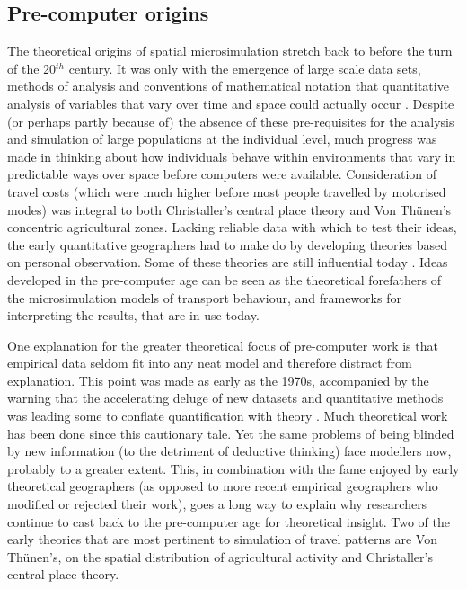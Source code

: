 \subsection{Pre-computer origins}
The theoretical origins of spatial microsimulation stretch back to before the
turn of the 20$^{th}$ century. It was only with the emergence of large scale
data sets, methods of analysis and conventions of mathematical notation that
quantitative analysis of variables that vary over time and space could actually
occur \citep{Ballas2009-sage}.
Despite (or perhaps partly because of) the absence of these pre-requisites for
the analysis and simulation of large populations at the individual level, much
progress was made in thinking about how individuals behave within environments
that vary in predictable ways over space before computers were available.
Consideration of travel costs (which were much higher before most
people travelled by motorised modes) was integral to both Christaller's
central place theory and Von Th\"{u}nen's concentric agricultural zones.
Lacking reliable data with which to test their ideas, the
early quantitative geographers had to make do by
developing theories based on personal observation.
Some of these theories are still influential today \citep{Clarke1985}.
Ideas developed in the pre-computer age can be seen as the theoretical
forefathers of the microsimulation models of transport behaviour, and frameworks
for interpreting the results, that are in use today.

One explanation for the greater theoretical focus of pre-computer work
is that empirical data seldom fit into any neat model and therefore
distract from explanation.
This point was made as early as the 1970s, accompanied by the
warning that the
accelerating deluge of new datasets and quantitative methods was leading some
to conflate quantification with theory \citep{Wilson1972-theoretical}.
Much theoretical work has been done since this cautionary tale. Yet the
same problems of being blinded by new information (to the detriment of
deductive thinking) face modellers now, probably to a greater extent.
This, in combination with the fame enjoyed by early theoretical geographers
(as opposed to more recent empirical geographers who modified or
rejected their work), goes a long way to explain why researchers continue to cast back to
the pre-computer age for theoretical
insight. Two of the early theories that are most pertinent to
simulation of travel patterns are Von Th\"{u}nen's, on the
spatial distribution of
agricultural activity and Christaller's central place theory.

